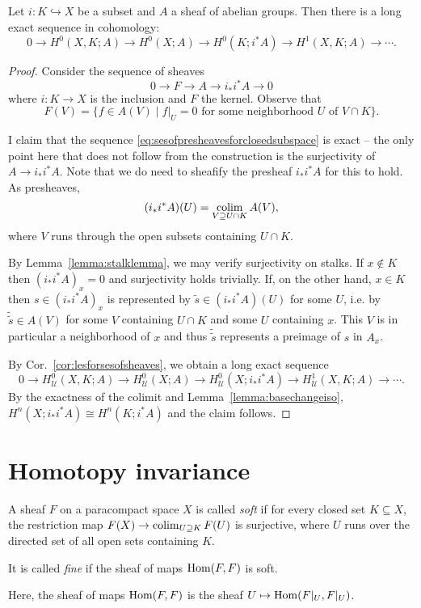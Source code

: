 \documentclass[a4paper,openany]{scrbook}
\begin{document}
\begin{corollary}\label{cor:sesforspaces}
Let $i\colon K \hookrightarrow X$ be a subset and $A$ a sheaf of abelian groups. Then there is a long exact sequence in cohomology:
\[
0 \to H^0(X,K;A) \to H^0(X;A) \to H^0(K;i^*A) \to H^1(X,K;A) \to \cdots.
\]
\end{corollary}
\begin{proof}
Consider the sequence of sheaves 
\begin{equation}\label{eq:sesofpresheavesforclosedsubspace}
0 \to F \to A \to i_*i^*A \to 0
\end{equation}
where $i \colon K \to X$ is the inclusion and $F$ the kernel. Observe that
\[
F(V) = \{f \in A(V) \mid f|_U = 0 \text{ for some neighborhood $U$ of $V \cap K$}\}.
\]

I claim that the sequence \eqref{eq:sesofpresheavesforclosedsubspace} is exact -- the only point here that does not follow from the construction is the surjectivity of $A \to i_*i^*A$. Note that we do need to sheafify the presheaf $i_*i^*A$ for this to hold. As presheaves,
\[
(i_*i^*A)(U) = \operatorname*{colim}_{V \supseteq U \cap K} A(V),
\]
where $V$ runs through the open subsets containing $U \cap K$. 

By Lemma~\ref{lemma:stalklemma}, we may verify surjectivity on stalks. If $x \not \in K$ then $(i_*i^*A)_x = 0$ and surjectivity holds trivially. If, on the other hand, $x \in K$ then $s \in (i_*i^*A)_x$ is represented by $\tilde s \in (i_*i^*A)(U)$ for some $U$, i.e. by $\tilde{\tilde s} \in A(V)$ for some $V$ containing $U \cap K$ and some $U$ containing $x$. This $V$ is in particular a neighborhood of $x$ and thus $\tilde{\tilde s}$ represents a preimage of $s$ in $A_x$.

By Cor.~\ref{cor:lesforsesofsheaves}, we obtain a long exact sequence
\[
0 \to H^0_{\mathcal U}(X,K;A) \to H^0_{\mathcal U}(X;A) \to H^0_{\mathcal U}(X;i_*i^*A) \to H^1_{\mathcal U}(X,K;A) \to \cdots.
\]
By the exactness of the colimit and Lemma~\ref{lemma:basechangeiso}, $H^n(X;i_*i^*A) \cong H^n(K;i^*A)$ and the claim follows.
\end{proof}


\section{Homotopy invariance}

\begin{defn} A sheaf $F$ on a paracompact space $X$ is called \emph{soft} if for every closed set $K \subseteq X$, the restriction map $F(X) \to \operatorname*{colim}_{U \supseteq K} F(U)$ is surjective, where $U$ runs over the directed set of all open sets containing $K$.

It is called \emph{fine} if the sheaf of maps $\operatorname{Hom}(F,F)$ is soft.
\end{defn}
Here, the sheaf of maps $\operatorname{Hom}(F,F)$ is the sheaf $U \mapsto \operatorname{Hom}(F|_U,F|_U)$.
\end{document}
